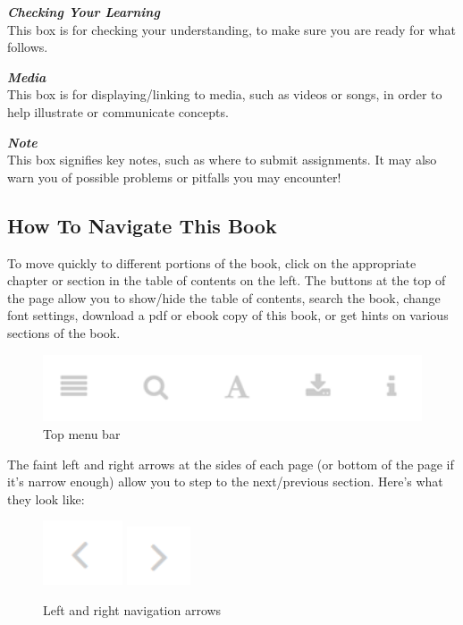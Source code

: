 \documentclass[
]{book}
\begin{document}
\begin{progress}
 \textbf{\emph{Checking Your Learning}}\\
 This box is for checking your understanding, to make sure you are ready
 for what follows.
 \end{progress}

\begin{video}
 \textbf{\emph{Media}}\\
 This box is for displaying/linking to media, such as videos or songs, in
 order to help illustrate or communicate concepts.
 \end{video}

\begin{caution}
 \textbf{\emph{Note}}\\
 This box signifies key notes, such as where to submit assignments. It
 may also warn you of possible problems or pitfalls you may encounter!
 \end{caution}

\hypertarget{how-to-navigate-this-book}{%
\subsection*{How To Navigate This Book}\label{how-to-navigate-this-book}}

To move quickly to different portions of the book, click on the appropriate chapter or section in the table of contents on the left. The buttons at the top of the page allow you to show/hide the table of contents, search the book, change font settings, download a pdf or ebook copy of this book, or get hints on various sections of the book.

\begin{figure}
 \includegraphics[width=4.56in]{assets/course-intro/menu} \caption{Top menu bar}\label{fig:unnamed-chunk-8}
 \end{figure}

The faint left and right arrows at the sides of each page (or bottom of the page if it's narrow enough) allow you to step to the next/previous section. Here's what they look like:

\begin{figure}
 \includegraphics[width=0.93in]{assets/course-intro/left_arrow} \includegraphics[width=0.74in]{assets/course-intro/right_arrow} \caption{Left and right navigation arrows}\label{fig:unnamed-chunk-9}
 \end{figure}
\end{document}
